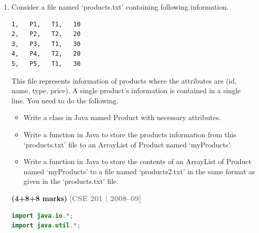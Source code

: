 \documentclass[12pt,a3paper]{article}
\newcommand{\yr}[1]{\hfill\textcolor{gray}{\small\textbf{[#1]}}}
\newcommand{\mk}[1]{\textcolor{orange!70!black}{\small\textbf{(#1 marks)}}}
\begin{document}
\begin{enumerate}
\begin{tcolorbox}[enhanced,breakable,ansbox,
  colback=cG!4,colframe=cG,boxrule=0.8pt,arc=5pt,
  title={\textbf{Answer --- Student HashMap with List Values}},
  fonttitle=\bfseries\color{white},colbacktitle=cG]
\begin{lstlisting}[language=Java]
    void printAll() {
        for (Map.Entry<Integer, List<String>> e : students.entrySet())
            System.out.println("ID: " + e.getKey()
                               + " -> " + e.getValue());
    }

    public static void main(String[] args) {
        StudentMap sm = new StudentMap();
        sm.addStudent(1001, "Alice", "Smith");
        sm.addStudent(1002, "Bob",   "Jones");
        sm.addStudent(1003, "Carol", "White");
        sm.printAll();
    }
}
\end{lstlisting}
\textbf{Output:}
\begin{verbatim}
ID: 1001 -> [Alice, Smith]
ID: 1002 -> [Bob, Jones]
ID: 1003 -> [Carol, White]
\end{verbatim}
\end{tcolorbox}

\item Consider a file named `products.txt' containing following information.

\begin{center}
\begin{verbatim}
1,   P1,   T1,   10
2,   P2,   T2,   20
3,   P3,   T1,   30
4,   P4,   T2,   20
5,   P5,   T1,   30
\end{verbatim}
\end{center}

This file represents information of products where the attributes are (id, name, type, price). A single product's information is contained in a single line. You need to do the following.

\begin{itemize}
    \item[(i)] Write a class in Java named Product with necessary attributes.
    \item[(ii)] Write a function in Java to store the products information from this `products.txt' file to an ArrayList of Product named `myProducts'.
    \item[(iii)] Write a function in Java to store the contents of an ArrayList of Product named `myProducts' to a file named `products2.txt' in the same format as given in the `products.txt' file.
\end{itemize}

\mk{4+8+8} \yr{CSE 201 | 2008--09}
\begin{tcolorbox}[enhanced,breakable,ansbox,
  colback=cG!4,colframe=cG,boxrule=0.8pt,arc=5pt,
  title={\textbf{Answer --- Product Read/Write from File}},
  fonttitle=\bfseries\color{white},colbacktitle=cG]
\begin{lstlisting}[language=Java]
import java.io.*;
import java.util.*;


\end{lstlisting}
\end{tcolorbox}
\end{enumerate}
\end{document}
